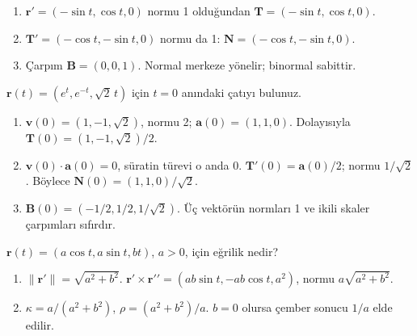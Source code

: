 \begin{tcolorbox}[title={Adım adım çözüm},colback=green!3!white,colframe=green]\begin{enumerate}
\item \(\mathbf r\prime=(-\sin t,\cos t,0)\) normu 1 olduğundan \(\mathbf T=(-\sin t,\cos t,0)\).
\item \(\mathbf T\prime=(-\cos t,-\sin t,0)\) normu da 1: \(\mathbf N=(-\cos t,-\sin t,0)\).
\item Çarpım \(\mathbf B=(0,0,1)\). Normal merkeze yönelir; binormal sabittir.
\end{enumerate}\end{tcolorbox}
\begin{tcolorbox}[title={Örnek 3.14 | Dersteki uzay eğrisinin Frenet üçlüsü},colframe=accent]\(\mathbf r(t)=(e^t,e^{-t},\sqrt2\,t)\) için \(t=0\) anındaki çatıyı bulunuz.
\par{}\end{tcolorbox}
\begin{tcolorbox}[title={Adım adım çözüm},colback=green!3!white,colframe=green]\begin{enumerate}
\item \(\mathbf v(0)=(1,-1,\sqrt2)\), normu 2; \(\mathbf a(0)=(1,1,0)\). Dolayısıyla \(\mathbf T(0)=(1,-1,\sqrt2)/2\).
\item \(\mathbf v(0)\cdot\mathbf a(0)=0\), süratin türevi o anda 0. \(\mathbf T\prime(0)=\mathbf a(0)/2\); normu \(1/\sqrt2\). Böylece \(\mathbf N(0)=(1,1,0)/\sqrt2\).
\item \(\mathbf B(0)=(-1/2,1/2,1/\sqrt2)\). Üç vektörün normları 1 ve ikili skaler çarpımları sıfırdır.
\end{enumerate}\end{tcolorbox}
\begin{tcolorbox}[title={Örnek 3.15 | Genel helisin eğriliği},colframe=accent]\(\mathbf r(t)=(a\cos t,a\sin t,bt)\), \(a>0\), için eğrilik nedir?
\par\vspace{1mm}{\scriptsize\sffamily Pekiştirme}\end{tcolorbox}
\begin{tcolorbox}[title={Adım adım çözüm},colback=green!3!white,colframe=green]\begin{enumerate}
\item \(\|\mathbf r\prime\|=\sqrt{a^2+b^2}\). \(\mathbf r\prime\times\mathbf r\prime\prime=(ab\sin t,-ab\cos t,a^2)\), normu \(a\sqrt{a^2+b^2}\).
\item \(\kappa=a/(a^2+b^2)\), \(\rho=(a^2+b^2)/a\). \(b=0\) olursa çember sonucu \(1/a\) elde edilir.
\end{enumerate}\end{tcolorbox}
